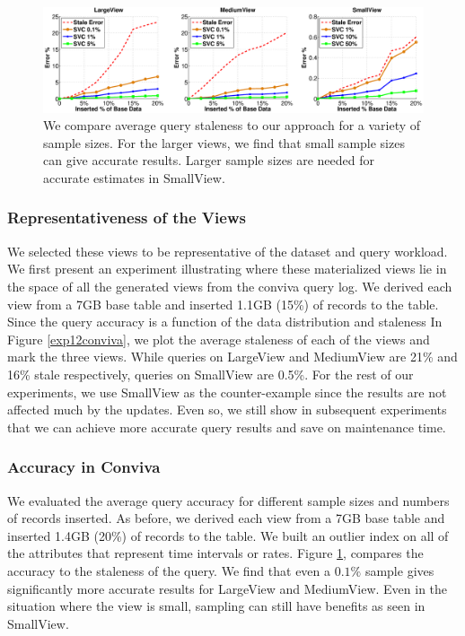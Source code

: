 \begin{figure}[t]
\hspace{-3.5em}
\includegraphics[scale=0.22]{exp/exp5-coniva-accuracy.eps}
 \caption{We compare average query staleness to our approach for a variety of sample sizes. For the larger views, we find that small sample sizes can give accurate results. Larger sample sizes are needed for accurate estimates in SmallView. \label{exp5conviva}}
\end{figure}



\subsubsection{Representativeness of the Views}
We selected these views to be representative of the dataset and query workload. 
We first present an experiment illustrating where these materialized views lie in the space of all the generated views from the conviva query log. 
We derived each view from a 7GB base table and inserted 1.1GB (15\%) of records to the table. 
Since the query accuracy is a function of the data distribution and staleness
In Figure \ref{exp12conviva}, we plot the average staleness of each of the views and mark the three views.
While queries on LargeView and MediumView are 21\% and 16\% stale respectively, queries on SmallView are 0.5\%.
For the rest of our experiments, we use SmallView as the counter-example since the results are not affected much by the updates.
Even so, we still show in subsequent experiments that we can achieve more accurate query results and save on maintenance time.

\subsubsection{Accuracy in Conviva}
We evaluated the average query accuracy for different sample sizes and numbers of records inserted.
As before, we derived each view from a 7GB base table and inserted 1.4GB (20\%) of records to the table. 
We built an outlier index on all of the attributes that represent time intervals or rates.
Figure \ref{exp5conviva}, compares the accuracy to the staleness of the query.
We find that even a $0.1\%$ sample gives significantly more accurate results for LargeView and MediumView.
Even in the situation where the view is small, sampling can still have benefits as seen in SmallView.

